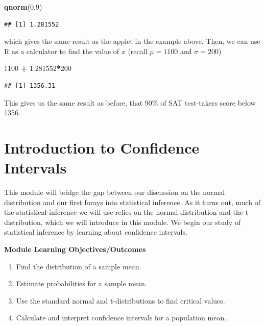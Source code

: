 \documentclass[
]{book}
\newenvironment{Shaded}{\begin{snugshade}}{\end{snugshade}}
\newcommand{\DecValTok}[1]{\textcolor[rgb]{0.00,0.00,0.81}{#1}}
\newcommand{\FloatTok}[1]{\textcolor[rgb]{0.00,0.00,0.81}{#1}}
\newcommand{\FunctionTok}[1]{\textcolor[rgb]{0.13,0.29,0.53}{\textbf{#1}}}
\newcommand{\NormalTok}[1]{#1}
\newcommand{\SpecialCharTok}[1]{\textcolor[rgb]{0.81,0.36,0.00}{\textbf{#1}}}
\providecommand{\tightlist}{%
  \setlength{\itemsep}{0pt}\setlength{\parskip}{0pt}}
\begin{document}
\begin{Shaded}
\begin{Highlighting}[]
\FunctionTok{qnorm}\NormalTok{(}\FloatTok{0.9}\NormalTok{)}
\end{Highlighting}
\end{Shaded}

\begin{verbatim}
## [1] 1.281552
\end{verbatim}

which gives the same result as the applet in the example above. Then, we can use R as a calculator to find the value of \(x\) (recall \(\mu=1100\) and \(\sigma=200\))

\begin{Shaded}
\begin{Highlighting}[]
\DecValTok{1100} \SpecialCharTok{+} \FloatTok{1.281552}\SpecialCharTok{*}\DecValTok{200}
\end{Highlighting}
\end{Shaded}

\begin{verbatim}
## [1] 1356.31
\end{verbatim}

This gives us the same result as before, that 90\% of SAT test-takers score below 1356.

\chapter{Introduction to Confidence Intervals}\label{introduction-to-confidence-intervals}

This module will bridge the gap between our discussion on the normal distribution and our first forays into statistical inference. As it turns out, much of the statistical inference we will use relies on the normal distribution and the t-distribution, which we will introduce in this module. We begin our study of statistical inference by learning about confidence intervals.

\textbf{Module Learning Objectives/Outcomes}

\begin{enumerate}
\def\labelenumi{\arabic{enumi}.}
\tightlist
\item
  Find the distribution of a sample mean.
\item
  Estimate probabilities for a sample mean.
\item
  Use the standard normal and t-distributions to find critical values.
\item
  Calculate and interpret confidence intervals for a population mean.
\end{enumerate}
\end{document}
